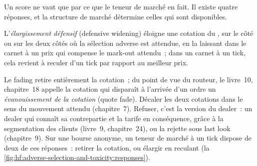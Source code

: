 Un score ne vaut que par ce que le teneur de marché en fait. Il existe quatre réponses, et la structure de marché détermine celles qui sont disponibles.

\begin{definition}\label{def:hf:adverse-selection-and-toxicity:widening}
L'\emph{élargissement défensif} (defensive widening) éloigne une cotation du , sur le côté ou sur les deux côtés où la sélection adverse est
attendue, en la laissant dans le carnet à un prix qui compense le mark-out attendu~; dans un carnet à un tick, cela revient à reculer d'un tick par rapport au
meilleur prix.
\end{definition}

Le fading retire entièrement la cotation~; du point de vue du routeur, le livre~10, chapitre~18 appelle la cotation qui disparaît à l'arrivée d'un ordre un
\emph{évanouissement de la cotation} (quote fade). Décaler les deux cotations dans le sens du mouvement attendu (chapitre~7). Refuser, c'est la version du dealer~: un dealer qui
connaît sa contrepartie et la tarife en conséquence, grâce à la segmentation des clients (livre~9, chapitre~24), ou la rejette sous last look (chapitre~9). Sur une
bourse anonyme, un teneur de marché à un tick dispose de deux de ces réponses~: retirer la cotation, ou élargir en reculant
(la \cref{fig:hf:adverse-selection-and-toxicity:responses}).

